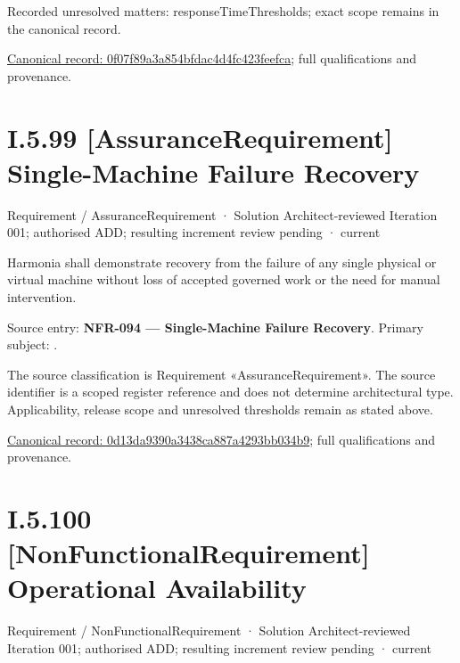 {\small Recorded unresolved matters: responseTimeThresholds; exact scope remains in the canonical record.}\par
{\footnotesize \href{../../../../continuum/motivation/requirement/non-functional-requirement/0f07f89a3a854bfdac4d4fc423feefca.md}{Canonical record: 0f07f89a3a854bfdac4d4fc423feefca}; full qualifications and provenance.}\par
\section*{I.5.99 [AssuranceRequirement] Single-Machine Failure Recovery}
\label{navigation:I.5.99}

\label{element:0d13da9390a3438ca887a4293bb034b9}
{\small Requirement / AssuranceRequirement · Solution Architect-reviewed Iteration 001; authorised ADD; resulting increment review pending · current}\par

Harmonia shall demonstrate recovery from the failure of any single physical or virtual machine without loss of accepted governed work or the need for manual intervention.



Source entry: \textbf{NFR-094 — Single-Machine Failure Recovery}. Primary subject: \texttt{}.



The source classification is Requirement «AssuranceRequirement». The source identifier is a scoped register reference and does not determine architectural type. Applicability, release scope and unresolved thresholds remain as stated above.


{\footnotesize \href{../../../../continuum/motivation/requirement/assurance-requirement/0d13da9390a3438ca887a4293bb034b9.md}{Canonical record: 0d13da9390a3438ca887a4293bb034b9}; full qualifications and provenance.}\par
\section*{I.5.100 [NonFunctionalRequirement] Operational Availability}
\label{navigation:I.5.100}

\label{element:65ac0367b7f241149ad1839032004039}
{\small Requirement / NonFunctionalRequirement · Solution Architect-reviewed Iteration 001; authorised ADD; resulting increment review pending · current}\par

